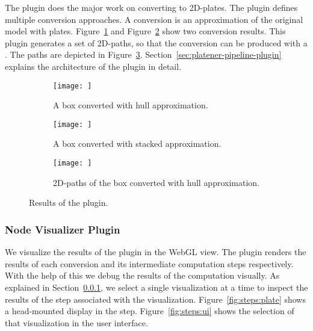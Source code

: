\documentclass[../ClassicThesis.tex]{subfiles}
\begin{document}
The  plugin does the major work on
converting {\threedmodels} to 2D-plates. The plugin defines
multiple conversion approaches. A conversion is an
approximation of the original model with plates.
Figure~\ref{fig:conversion:plate} and
Figure~\ref{fig:conversion:stacked} show two conversion
results. This plugin generates a set of 2D-paths, so that
the conversion can be produced with a {\lasercutter}. The
paths are depicted in Figure~\ref{fig:conversion:paths}.
Section~\ref{sec:platener-pipeline-plugin} explains the
architecture of the  plugin in
detail.

\begin{figure}[h]
  \centering
  \begin{subfigure}[a]{0.3222\textwidth}
    \texttt{[image: ]}
    \caption{A box converted with hull approximation.}
    \label{fig:conversion:plate}
  \end{subfigure}
  \begin{subfigure}[b]{0.3222\textwidth}
    \texttt{[image: ]}
    \caption{A box converted with stacked approximation.}
    \label{fig:conversion:stacked}
  \end{subfigure}
  \begin{subfigure}[c]{0.3222\textwidth}
    \texttt{[image: ]}
    \caption{2D-paths of the box converted with hull approximation.}
    \label{fig:conversion:paths}
  \end{subfigure}
  \caption{Results of the  plugin.}
  \label{fig:conversion}
\end{figure}


\subsubsection{Node Visualizer Plugin}

We visualize the results of the 
plugin in the WebGL view. The  plugin
renders the results of each conversion and its intermediate
computation steps respectively. With the help of this we
debug the results of the computation visually. As explained
in Section~\ref{}, we select a
single visualization at a time to inspect the results of the
step associated with the visualization.
Figure~\ref{fig:steps:plate} shows a head-mounted display in
the  step. Figure~\ref{fig:steps:ui} shows the
selection of that visualization in the user interface.
\end{document}

